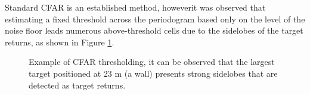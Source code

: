 Standard CFAR is an established method, howeverit was observed that estimating a fixed threshold across the periodogram based only on the level of the noise floor leads numerous above-threshold cells due to the sidelobes of the target returns, as shown in Figure \ref{fig:RadThesh_CFAR_abv_thresh_doubl}.

	\begin{figure}[H]
	\centering
	
	\hfill
	
	\caption[]{Example of CFAR thresholding, it can be observed that the largest target positioned at 23 m (a wall) presents strong sidelobes that are detected as target returns.}
	\label{fig:RadThesh_CFAR_abv_thresh_doubl}
\end{figure}



